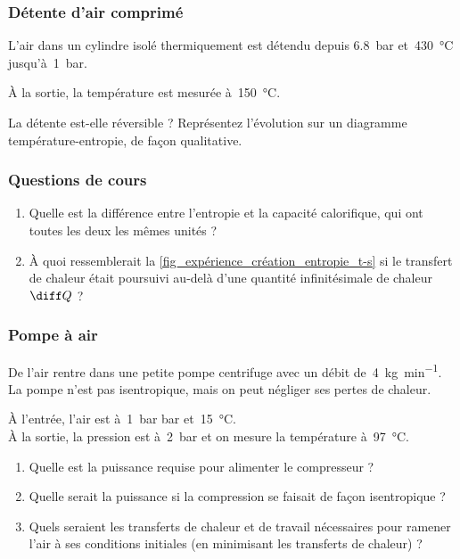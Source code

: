 \subsubsection{Détente d’air comprimé}

	L’air dans un cylindre isolé thermiquement est détendu depuis \SI{6,8}{\bar} et~\SI{430}{\degreeCelsius} jusqu’à~\SI{1}{\bar}.

	À la sortie, la température est mesurée à~\SI{150}{\degreeCelsius}.

	La détente est-elle réversible ? Représentez l’évolution sur un diagramme température-entropie, de façon qualitative.

\subsubsection{Questions de cours}

	\begin{enumerate}
		\item Quelle est la différence entre l’entropie et la capacité calorifique, qui ont toutes les deux les mêmes unités ?
		\item À quoi ressemblerait la \cref{fig_expérience_création_entropie_t-s} si le transfert de chaleur était poursuivi au-delà d’une quantité infinitésimale de chaleur $\diff Q$ ?
	\end{enumerate}


\subsubsection{Pompe à air}

	De l’air rentre dans une petite pompe centrifuge avec un débit de~\SI{4}{\kilogram\per\minute}. La pompe n’est pas isentropique, mais on peut négliger ses pertes de chaleur. 

	À l’entrée, l’air est  à~\SI{1}{\bar} bar et~\SI{15}{\degreeCelsius}.\\
	À la sortie, la pression est à~\SI{2}{\bar} et on mesure la température à~\SI{97}{\degreeCelsius}.

	\begin{enumerate}
		\item Quelle est la puissance requise pour alimenter le compresseur ?
		\item Quelle serait la puissance si la compression se faisait de façon isentropique ?
		\item Quels seraient les transferts de chaleur et de travail nécessaires pour ramener l’air à ses conditions initiales (en minimisant les transferts de chaleur) ?
	\end{enumerate}

